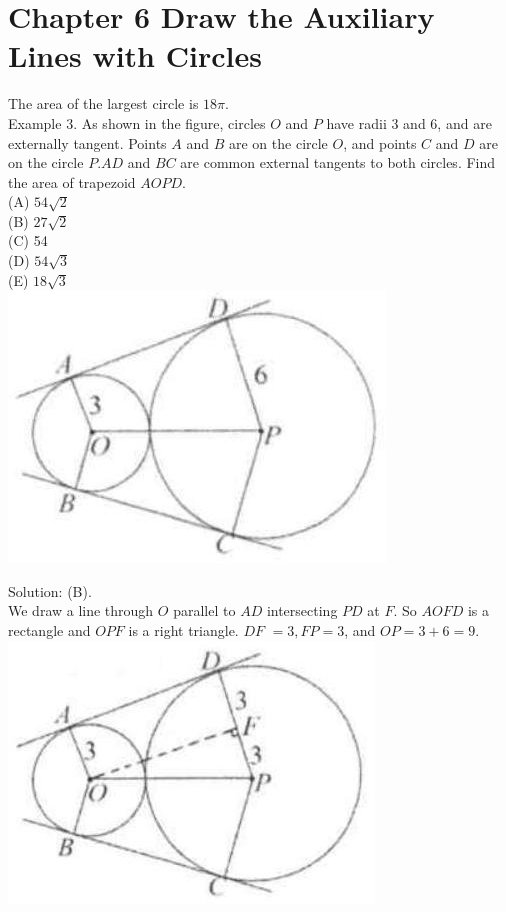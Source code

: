 \documentclass[10pt]{article}
\begin{document}
\section*{Chapter 6 Draw the Auxiliary Lines with Circles}
The area of the largest circle is \(18 \pi\).\\
Example 3. As shown in the figure, circles \(O\) and \(P\) have radii 3 and 6, and are externally tangent. Points \(A\) and \(B\) are on the circle \(O\), and points \(C\) and \(D\) are on the circle \(P . A D\) and \(B C\) are common external tangents to both circles. Find the area of trapezoid \(A O P D\).\\
(A) \(54 \sqrt{2}\)\\
(B) \(27 \sqrt{2}\)\\
(C) 54\\
(D) \(54 \sqrt{3}\)\\
(E) \(18 \sqrt{3}\)\\
\includegraphics[max width=\textwidth, center]{2025_04_17_97bc1f7e44d93c271a88g-177(2)}

Solution: (B).\\
We draw a line through \(O\) parallel to \(A D\) intersecting \(P D\) at \(F\). So \(A O F D\) is a rectangle and \(O P F\) is a right triangle. \(D F\) \(=3, F P=3\), and \(O P=3+6=9\).\\
\includegraphics[max width=\textwidth, center]{2025_04_17_97bc1f7e44d93c271a88g-177}
\end{document}
